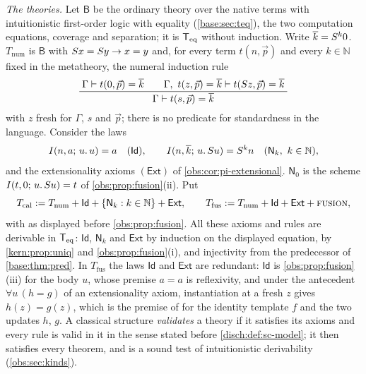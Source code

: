 \emph{The theories.} Let $\mathsf{B}$ be the ordinary theory over the native
terms with intuitionistic first-order logic with equality
(\cref{base:sec:teq}), the two computation equations, coverage and
separation; it is $\mathsf{T}_{\mathrm{eq}}$ without induction. Write $\overline{k}=S^{k}0$.
$T_{\mathrm{num}}$ is $\mathsf{B}$ with $S x=S y\to x=y$ and, for every
term $t(n,\vec p)$ and every $k\in\mathbb{N}$ fixed in the metatheory, the
numeral induction rule
\[
\dfrac{\;\Gamma\vdash t(0,\vec p)=\overline{k}\qquad
\Gamma,\ t(z,\vec p)=\overline{k}\vdash t(S z,\vec p)=\overline{k}\;}{\;\Gamma\vdash t(s,\vec p)=\overline{k}\;}
\]
with $z$ fresh for $\Gamma$, $s$ and $\vec p$; there is no predicate for
standardness in the language. Consider the laws
\[
\It{n}{a}{u}{u}=a\quad(\mathsf{Id}),\qquad
\It{n}{\overline{k}}{u}{\Suc u}=\Suc^{k}n\quad(\mathsf{N}_k,\ k\in\mathbb{N}),
\]
and the extensionality axioms $(\mathsf{Ext})$ of \cref{obs:cor:pi-extensional}.
$\mathsf{N}_0$ is the scheme $I(t,0;\,u.\,S u)=t$ of
\cref{obs:prop:fusion}(ii). Put
\[
T_{\mathrm{cal}}\defeq T_{\mathrm{num}}+\mathsf{Id}+\{\mathsf{N}_k:k\in\mathbb{N}\}+\mathsf{Ext},
\qquad
T_{\mathrm{fus}}\defeq T_{\mathrm{num}}+\mathsf{Id}+\mathsf{Ext}+\rulename{Fusion},
\]
with  as displayed before \cref{obs:prop:fusion}. All these
axioms and rules are derivable in $\mathsf{T}_{\mathrm{eq}}$: $\mathsf{Id}$, $\mathsf{N}_k$ and
$\mathsf{Ext}$ by induction on the displayed equation,  by
\cref{kern:prop:uniq} and \cref{obs:prop:fusion}(i), and injectivity from the
predecessor of \cref{base:thm:pred}. In $T_{\mathrm{fus}}$ the laws
$\mathsf{Id}$ and $\mathsf{Ext}$ are redundant: $\mathsf{Id}$ is
\cref{obs:prop:fusion}(iii) for the body $u$, whose premise $a=a$ is
reflexivity, and under the antecedent $\forall u\,(h=g)$ of an extensionality
axiom, instantiation at a fresh $z$ gives $h(z)=g(z)$, which is the premise of
 for the identity template $f$ and the two updates $h$, $g$.
A classical structure \emph{validates} a theory if it satisfies its axioms and
every rule is valid in it in the sense stated before
\cref{disch:def:sc-model}; it then satisfies every theorem, and is a sound
test of intuitionistic derivability (\cref{obs:sec:kinds}).

